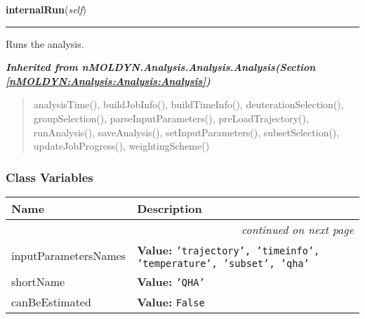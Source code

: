     \label{nMOLDYN:Analysis:Dynamics:QuasiHarmonicAnalysis:internalRun}

    \vspace{0.5ex}

\hspace{.8\funcindent}\begin{boxedminipage}{\funcwidth}

    \raggedright \textbf{internalRun}(\textit{self})

    \vspace{-1.5ex}

    \rule{\textwidth}{0.5\fboxrule}
\setlength{\parskip}{2ex}
    Runs the analysis.

\setlength{\parskip}{1ex}
    \end{boxedminipage}


\large{\textbf{\textit{Inherited from nMOLDYN.Analysis.Analysis.Analysis\textit{(Section \ref{nMOLDYN:Analysis:Analysis:Analysis})}}}}

\begin{quote}
analysisTime(), buildJobInfo(), buildTimeInfo(), deuterationSelection(), groupSelection(), parseInputParameters(), preLoadTrajectory(), runAnalysis(), saveAnalysis(), setInputParameters(), subsetSelection(), updateJobProgress(), weightingScheme()
\end{quote}


  \subsubsection{Class Variables}

    \vspace{-1cm}
\hspace{\varindent}\begin{longtable}{|p{\varnamewidth}|p{\vardescrwidth}|l}
\cline{1-2}
\cline{1-2} \centering \textbf{Name} & \centering \textbf{Description}& \\
\cline{1-2}
\endhead\cline{1-2}\multicolumn{3}{r}{\small\textit{continued on next page}}\\\endfoot\cline{1-2}
\endlastfoot\raggedright i\-n\-p\-u\-t\-P\-a\-r\-a\-m\-e\-t\-e\-r\-s\-N\-a\-m\-e\-s\- & \raggedright \textbf{Value:} 
{\tt 'trajectory', 'timeinfo', 'temperature', 'subset', 'qha'}&\\
\cline{1-2}
\raggedright s\-h\-o\-r\-t\-N\-a\-m\-e\- & \raggedright \textbf{Value:} 
{\tt 'QHA'}&\\
\cline{1-2}
\raggedright c\-a\-n\-B\-e\-E\-s\-t\-i\-m\-a\-t\-e\-d\- & \raggedright \textbf{Value:} 
{\tt False}&\\
\cline{1-2}
\end{longtable}

